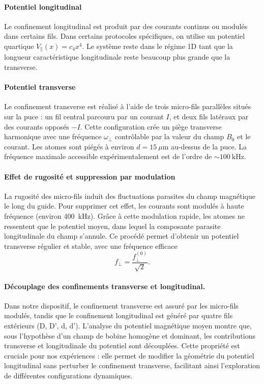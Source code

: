 \paragraph{Potentiel longitudinal}

Le confinement longitudinal est produit par des courants continus ou modulés dans certains fils. Dans certains protocoles spécifiques, on utilise un potentiel quartique \( V_\parallel(x) = c_4 x^4 \). Le système reste dans le régime 1D tant que la longueur caractéristique longitudinale reste beaucoup plus grande que la transverse.

\paragraph{Potentiel transverse}

Le confinement transverse est réalisé à l’aide de trois micro-fils parallèles situés sur la puce : un fil central parcouru par un courant \( I \), et deux fils latéraux par des courants opposés \(-I\). Cette configuration crée un piège transverse harmonique avec une fréquence \(\omega_\perp\) contrôlable par la valeur du champ \( B_0 \) et le courant. Les atomes sont piégés à environ \( d = 15~\mu\text{m} \) au-dessus de la puce. La fréquence maximale accessible expérimentalement est de l’ordre de \( \sim 100~\text{kHz} \).

\paragraph{Effet de rugosité et suppression par modulation}

La rugosité des micro-fils induit des fluctuations parasites du champ magnétique le long du guide. Pour supprimer cet effet, les courants sont modulés à haute fréquence (environ 400~kHz). Grâce à cette modulation rapide, les atomes ne ressentent que le potentiel moyen, dans lequel la composante parasite longitudinale du champ s’annule. Ce procédé permet d’obtenir un potentiel transverse régulier et stable, avec une fréquence efficace \[ f_\perp = \frac{f_\perp^{(0)}}{\sqrt{2}}. \]

\paragraph{Découplage des confinements transverse et longitudinal.}
Dans notre dispositif, le confinement transverse est assuré par les micro-fils modulés, tandis que le confinement longitudinal est généré par quatre fils extérieurs (D, D', d, d'). L’analyse du potentiel magnétique moyen montre que, sous l’hypothèse d’un champ de bobine homogène et dominant, les contributions transverse et longitudinale du potentiel sont découplées. Cette propriété est cruciale pour nos expériences : elle permet de modifier la géométrie du potentiel longitudinal sans perturber le confinement transverse, facilitant ainsi l’exploration de différentes configurations dynamiques.

